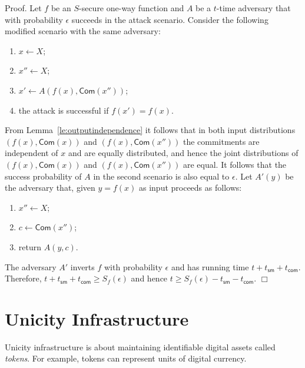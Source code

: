 \documentclass{article}
\newtheorem{lemma}{Lemma}[section]
\newenvironment{proof}{\textsf{Proof}.}{\hfill$\Box$}
\newcommand{\commit}[0]{\mathsf{Com}}
\begin{document}
\begin{proof}
Let $f$ be an $S$-secure one-way function and $A$ be a $t$-time adversary that with probability $\epsilon$ succeeds in the attack scenario.
Consider the following modified scenario with the same adversary:
\begin{enumerate}
\item $x\gets X$;
\item $x''\gets X$;
\item $x'\gets A(f(x),\commit(x''))$;
\item the attack is successful if $f(x')=f(x)$.
\end{enumerate}

\noindent From Lemma~\ref{le:outputindependence} it follows that in both input distributions $(f(x),\commit(x))$ and $(f(x),\commit(x''))$ the commitments are independent of $x$ and are equally distributed, and hence
the joint distributions of $(f(x),\commit(x))$ and $(f(x),\commit(x''))$ are equal. It follows that the success probability of $A$ in the second scenario is also equal to $\epsilon$. Let $A'(y)$ be the adversary that, given $y=f(x)$ as input proceeds as follows:
\begin{enumerate}
\item $x''\gets X$;
\item $c\gets \commit(x'')$;
\item return $A(y,c)$.
\end{enumerate}

\noindent The adversary $A'$ inverts $f$ with probability $\epsilon$ and has running time $t+t_\mathsf{sm} + t_\mathsf{com}$. Therefore, $t+t_\mathsf{sm} + t_\mathsf{com}\ge S_f(\epsilon)$ and hence $t\ge S_f(\epsilon)- t_\mathsf{sm} - t_\mathsf{com}$.
\end{proof}
\medskip


\section{Unicity Infrastructure}

Unicity infrastructure is about maintaining identifiable digital assets called \emph{tokens}. For example, tokens can represent units of digital currency.
\end{document}
